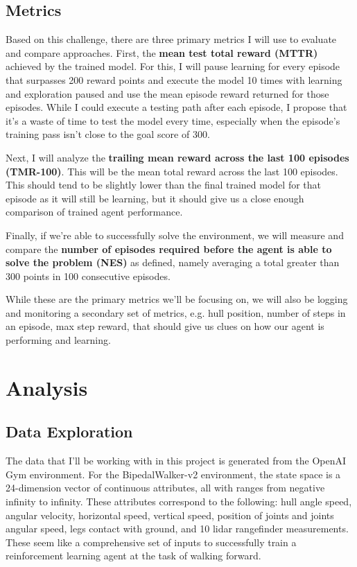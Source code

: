 \documentclass{article}
\begin{document}
\subsection{Metrics}
Based on this challenge, there are three primary metrics I will use to evaluate and compare approaches. First, the \textbf{mean test total reward (MTTR)} achieved by the trained model. For this, I will pause learning for every episode that surpasses 200 reward points and execute the model 10 times with learning and exploration paused and use the mean episode reward returned for those episodes. While I could execute a testing path after each episode, I propose that it's a waste of time to test the model every time, especially when the episode's training pass isn't close to the goal score of 300.

Next, I will analyze the \textbf{trailing mean reward across the last 100 episodes (TMR-100)}. This will be the mean total reward across the last 100 episodes. This should tend to be slightly lower than the final trained model for that episode as it will still be learning, but it should give us a close enough comparison of trained agent performance. 

Finally, if we're able to successfully solve the environment, we will measure and compare the \textbf{number of episodes required before the agent is able to solve the problem (NES)} as defined, namely averaging a total greater than 300 points in 100 consecutive episodes.

While these are the primary metrics we'll be focusing on, we will also be logging and monitoring a secondary set of metrics, e.g. hull position, number of steps in an episode, max step reward, that should give us clues on how our agent is performing and learning.


\section{Analysis}
\label{sec:analysis}

\subsection{Data Exploration}
The data that I'll be working with in this project is generated from the OpenAI Gym environment. For the BipedalWalker-v2 environment, the state space is a 24-dimension vector of continuous attributes, all with ranges from negative infinity to infinity. These attributes correspond to the following: hull angle speed, angular velocity, horizontal speed, vertical speed, position of joints and joints angular speed, legs contact with ground, and 10 lidar rangefinder measurements. These seem like a comprehensive set of inputs to successfully train a reinforcement learning agent at the task of walking forward.  
\end{document}
